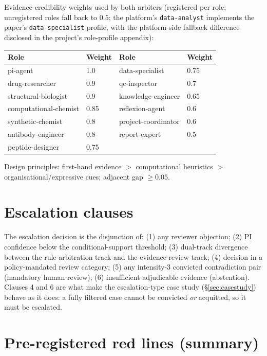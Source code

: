 \documentclass[11pt]{article}
\begin{document}
Evidence-credibility weights used by both arbiters (registered per role;
unregistered roles fall back to $0.5$; the platform's
\texttt{data-analyst} implements the paper's \texttt{data-specialist}
profile, with the platform-side fallback difference disclosed in the
project's role-profile appendix):

\begin{table}[h]
\centering\small
\begin{tabular}{@{}llll@{}}
\toprule
Role & Weight & Role & Weight \\
\midrule
pi-agent & 1.0 & data-specialist & 0.75 \\
drug-researcher & 0.9 & qc-inspector & 0.7 \\
structural-biologist & 0.9 & knowledge-engineer & 0.65 \\
computational-chemist & 0.85 & reflexion-agent & 0.6 \\
synthetic-chemist & 0.8 & project-coordinator & 0.6 \\
antibody-engineer & 0.8 & report-expert & 0.5 \\
peptide-designer & 0.75 & & \\
\bottomrule
\end{tabular}
\end{table}

Design principles: first-hand evidence $>$ computational
heuristics $>$ organisational/expressive cues; adjacent gap $\geq 0.05$.

\section{Escalation clauses}\label{app:clauses}

The escalation decision is the disjunction of: (1) any reviewer objection;
(2) PI confidence below the conditional-support threshold; (3) dual-track
divergence between the rule-arbitration track and the evidence-review
track; (4) decision in a policy-mandated review category; (5) any
intensity-3 convicted contradiction pair (mandatory human review); (6)
insufficient adjudicable evidence (abstention). Clauses 4 and 6 are what
make the escalation-type case study (\S\ref{sec:casestudy}) behave as it
does: a fully filtered case cannot be convicted \emph{or} acquitted, so it
must be escalated.

\section{Pre-registered red lines (summary)}\label{app:redlines}
\end{document}
